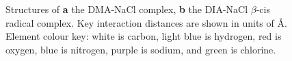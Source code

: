 \begin{figure}[!htbp]
	\centering


  \caption[Structures of the DIA-NaCl complex and radical complex.]{Structures
  of \textbf{a} the DMA-NaCl complex, \textbf{b} the DIA-NaCl $\beta$-cis
  radical complex. Key interaction distances are shown in units of \AA. Element
  colour key: white is carbon, light blue is hydrogen, red is oxygen, blue is
  nitrogen, purple is sodium, and green is chlorine.} \label{fig:dia-na-cl}
\end{figure}

